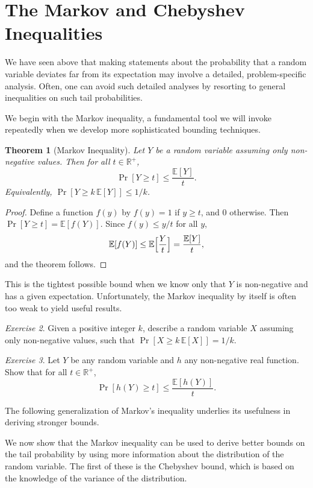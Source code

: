 \documentclass[twoside,12pt]{book}
\theoremstyle{plain}
\newtheorem{theorem}{Theorem}[chapter]
\theoremstyle{definition}
\theoremstyle{remark}
\newtheorem{exercise}[theorem]{Exercise}
\begin{document}
\section{The Markov and Chebyshev Inequalities}
\label{sec:markov-chebyshev}

We have seen above that making statements about the probability that a random variable deviates far from its expectation may involve a detailed, problem-specific analysis. Often, one can avoid such detailed analyses by resorting to general inequalities on such tail probabilities.

We begin with the Markov inequality, a fundamental tool we will invoke repeatedly when we develop more sophisticated bounding techniques.

\begin{theorem}[Markov Inequality]
\label{thm:markov}
Let $Y$ be a random variable assuming only non-negative values. Then for all $t \in \mathbb{R}^+$,
\[
\Pr[Y \geq t] \leq \frac{\mathbb{E}[Y]}{t}.
\]
Equivalently, $\Pr[Y \geq k\,\mathbb{E}[Y]] \leq 1/k$.
\end{theorem}

\begin{proof}
Define a function $f(y)$ by $f(y) = 1$ if $y \geq t$, and $0$ otherwise. Then $\Pr[Y \geq t] = \mathbb{E}[f(Y)]$. Since $f(y) \leq y/t$ for all $y$,
\[
\mathbb{E}[f(Y)] \leq \mathbb{E}\Bigl[\frac{Y}{t}\Bigr] = \frac{\mathbb{E}[Y]}{t},
\]
and the theorem follows.
\end{proof}

This is the tightest possible bound when we know only that $Y$ is non-negative and has a given expectation. Unfortunately, the Markov inequality by itself is often too weak to yield useful results.

\begin{exercise}
Given a positive integer $k$, describe a random variable $X$ assuming only non-negative values, such that $\Pr[X \geq k\,\mathbb{E}[X]] = 1/k$.
\end{exercise}

\begin{exercise}
Let $Y$ be any random variable and $h$ any non-negative real function. Show that for all $t \in \mathbb{R}^+$,
\[
\Pr[h(Y) \geq t] \leq \frac{\mathbb{E}[h(Y)]}{t}.
\]
\end{exercise}

The following generalization of Markov's inequality underlies its usefulness in deriving stronger bounds.

We now show that the Markov inequality can be used to derive better bounds on the tail probability by using more information about the distribution of the random variable. The first of these is the Chebyshev bound, which is based on the knowledge of the variance of the distribution.
\end{document}
